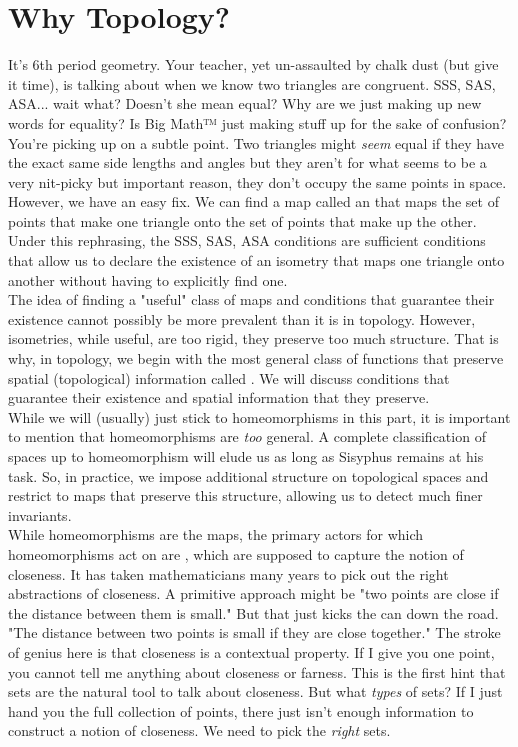 \chapter*{Why Topology?}
It's 6th period geometry. Your teacher, yet un-assaulted by chalk dust (but give it time), is talking about when we know two triangles are congruent. SSS, SAS, ASA... wait what? Doesn't she mean equal? Why are we just making up new words for equality? Is Big Math™ just making stuff up for the sake of confusion? \\

You're picking up on a subtle point. Two triangles might \emph{seem} equal if they have the exact same side lengths and angles but they aren't for what seems to be a very nit-picky but important reason, they don't occupy the same points in space. However, we have an easy fix. We can find a map called an  that maps the set of points that make one triangle onto the set of points that make up the other. Under this rephrasing, the SSS, SAS, ASA conditions are sufficient conditions that allow us to declare the existence of an isometry that maps one triangle onto another without having to explicitly find one. \\

The idea of finding a "useful" class of maps and conditions that guarantee their existence cannot possibly be more prevalent than it is in topology. However, isometries, while useful, are too rigid, they preserve too much structure. That is why, in topology, we begin with the most general class of functions that preserve spatial (topological) information called . We will discuss conditions that guarantee their existence and spatial information that they preserve. \\ 

While we will (usually) just stick to homeomorphisms in this part, it is important to mention that homeomorphisms are \emph{too} general. A complete classification of spaces up to homeomorphism will elude us as long as Sisyphus remains at his task. So, in practice, we impose additional structure on topological spaces and restrict to maps that preserve this structure, allowing us to detect much finer invariants.\\ 

While homeomorphisms are the maps, the primary actors for which homeomorphisms act on are , which are supposed to capture the notion of closeness. It has taken mathematicians many years to pick out the right abstractions of closeness. A primitive approach might be "two points are close if the distance between them is small." But that just kicks the can down the road. "The distance between two points is small if they are close together." The stroke of genius here is that closeness is a contextual property. If I give you one point, you cannot tell me anything about closeness or farness. This is the first hint that sets are the natural tool to talk about closeness. But what \emph{types} of sets? If I just hand you the full collection of points, there just isn't enough information to construct a notion of closeness. We need to pick the \emph{right} sets. \\ 

